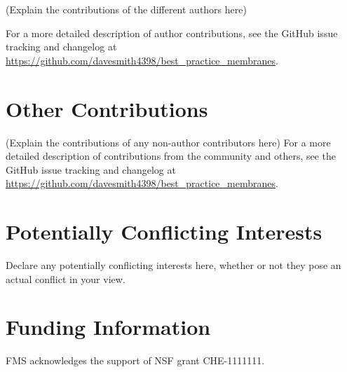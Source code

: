 \documentclass[9pt,bestpractices]{livecoms}
\newcommand{\githubrepository}{\url{https://github.com/davesmith4398/best_practice_membranes}}  %
\begin{document}
(Explain the contributions of the different authors here)

For a more detailed description of author contributions,
see the GitHub issue tracking and changelog at \githubrepository.

\section{Other Contributions}
%

(Explain the contributions of any non-author contributors here)
For a more detailed description of contributions from the community and others, see the GitHub issue tracking and changelog at \githubrepository.

\section{Potentially Conflicting Interests}

Declare any potentially conflicting interests here, whether or not they pose an actual conflict in your view.

\section{Funding Information}
FMS acknowledges the support of NSF grant CHE-1111111.




\end{document}
